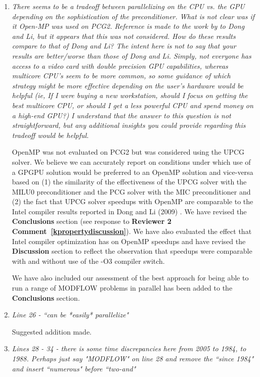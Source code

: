 \documentclass[12pt]{article} %
\begin{document}
\begin{enumerate}
\item \textit{There seems to be a tradeoff between parallelizing on the CPU vs. the GPU depending on the sophistication of the preconditioner. What is not clear was if it Open-MP was used on PCG2. Reference is made to the work by to Dong and Li, but it appears that this was not considered. How do these results compare to that of Dong and Li? The intent here is not to say that your results are better/worse than those of Dong and Li. Simply, not everyone has access to a video card with double precision GPU capabilities, whereas multicore CPU's seem to be more common, so some guidance of which strategy might be more effective depending on the user's hardware would be helpful (ie, If I were buying a new workstation, should I focus on getting the best multicore CPU, or should I get a less powerful CPU and spend money on a high-end GPU?) I understand that the answer to this question is not straightforward, but any additional insights you could provide regarding this tradeoff would be helpful.} 

OpenMP was not evaluated on PCG2 but was considered using the UPCG solver. We believe we can accurately report on conditions under which use of a GPGPU solution would be preferred to an OpenMP solution and vice-versa based on (1) the similarity of the effectiveness of the UPCG solver with the MILU0 preconditioner and the PCG solver with the MIC preconditioner and (2) the fact that UPCG solver speedups with OpenMP are comparable to the Intel compiler results reported in Dong and Li (2009) . We have revised the \textbf{Conclusions} section (see response to \textbf{Reviewer 2 Comment~\ref{kpropertydiscussion}}). We have also evaluated the effect that Intel compiler optimization has on OpenMP speedups and have revised the \textbf{Discussion} section to reflect the observation that speedups were comparable with and without use of the -O3 compiler switch.

We have also included our assessment of the best approach for being able to run a range of MODFLOW problems in parallel has been added to the \textbf{Conclusions} section.

\item \textit{Line 26 - ``can be *easily* parallelize"} 

Suggested addition made. 

\item \textit{Lines 28 - 34 - there is some time discrepancies here from 2005 to 1984, to 1988. Perhaps just say "MODFLOW" on line 28 and remove the ``since 1984" and insert ``numerous" before ``two-and" } 


\end{enumerate}
\end{document}
